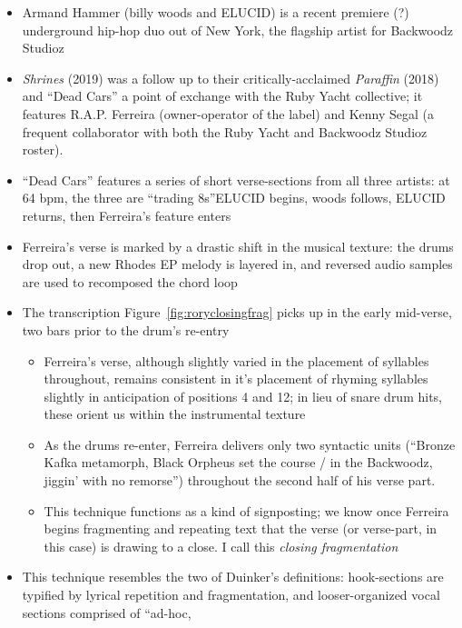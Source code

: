 \begin{itemize}
    \item Armand Hammer (billy woods and ELUCID) is a recent premiere (?) underground hip-hop duo out of
    New York, the flagship artist for Backwoodz Studioz
    \item \textit{Shrines} (2019) was a follow up to their critically-acclaimed \textit{Paraffin} (2018) 
    and ``Dead Cars'' a point of exchange with the Ruby Yacht collective; it features R.A.P. Ferreira 
    (owner-operator of the label) and Kenny Segal (a frequent collaborator with both the Ruby Yacht and 
    Backwoodz Studioz roster).
    \item ``Dead Cars'' features a series of short verse-sections from all three artists: at 64 bpm, 
    the three are ``trading 8s''\textemdash  ELUCID begins, woods follows, ELUCID returns, then Ferreira's
    feature enters
    \item Ferreira's verse is marked by a drastic shift in the musical texture: the drums drop out, a
    new Rhodes EP melody is layered in, and reversed audio samples are used to recomposed the chord
    loop
    \item The transcription Figure~\ref{fig:roryclosingfrag} picks up in the early mid-verse, 
    two bars prior to the drum's re-entry
        \begin{itemize}
            \item Ferreira's verse, although slightly varied in the placement of syllables throughout,
            remains consistent in it's placement of rhyming syllables slightly in anticipation of positions
            4 and 12; in lieu of snare drum hits, these orient us within the instrumental texture
            \item As the drums re-enter, Ferreira delivers only two syntactic units (``Bronze Kafka
            metamorph, Black Orpheus set the course / in the Backwoodz, jiggin' with no remorse'') throughout
            the second half of his verse part.
            \item This technique functions as a kind of signposting; we know once Ferreira begins
            fragmenting and repeating text that the verse (or verse-part, in this case) is drawing
            to a close. I call this \textit{closing fragmentation}
        \end{itemize}
    \item This technique resembles the two of Duinker's definitions: hook-sections are typified by
    lyrical repetition and fragmentation, and looser-organized vocal sections comprised of ``ad-hoc,

\end{itemize}
